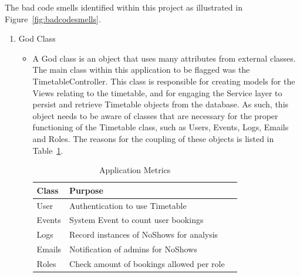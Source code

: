 The bad code smells identified within this project as illustrated in Figure~\ref{fig:badcodesmells}.

\begin{enumerate}
\item God Class
\begin{itemize}
\item A God class is an object that uses many attributes from external classes. The main class within this application to be flagged was the TimetableController. This class is responsible for creating models for the Views relating to the timetable, and for engaging the Service layer to persist and retrieve Timetable objects from the database. As such, this object needs to be aware of classes that are necessary for the proper functioning of the Timetable class, such as Users, Events, Logs, Emails and Roles. The reasons for the coupling of these objects is listed in Table~\ref{fig:godclass}.
\begin{table}[H]
\begin{center}
    \begin{tabular}{| l | l | p{2.3cm} |}
    \hline
    Class & Purpose\\ \hline
	User & Authentication to use Timetable \\ \hline
	Events & System Event to count user bookings \\ \hline
	Logs & Record instances of NoShows for analysis \\ \hline
	Emails & Notification of admins for NoShows \\ \hline
	Roles & Check amount of bookings allowed per role \\ \hline	
    \end{tabular}
\end{center}
\caption{Application Metrics}
\label{fig:godclass}
\end{table}


\end{itemize}
\end{enumerate}
